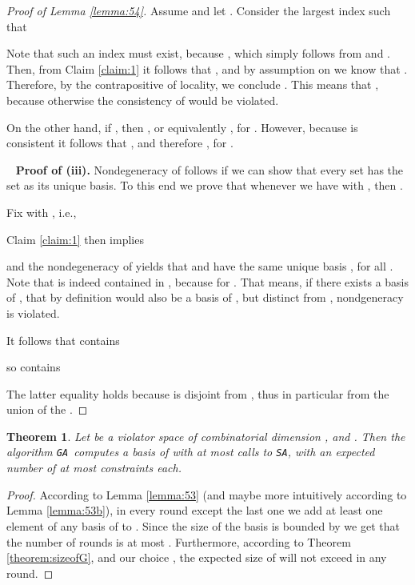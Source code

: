 \documentclass[12pt]{article}
\newtheorem{theorem2}{Theorem}[section]
\newenvironment{theorem}{\begin{theorem2}}{\end{theorem2}}
\theoremstyle{remark}
\def\stageI{\texttt{GA}}
\def\stageII{\texttt{SA}}
\begin{document}
\begin{proof}[Proof of Lemma \ref{lemma:54}]
     Assume  and let . Consider the largest index
      such that
     
     Note that such an index  must exist, because , which
     simply follows from  and .
     Then, from Claim \ref{claim:1} it follows that , and
     by assumption on  we know that . Therefore, by the contrapositive of locality,
     we conclude .
     This means that , because otherwise the 
consistency of 
     would be violated.
     
     On the other hand, if , then , or equivalently
     , for .
    However, because  is consistent it follows that , and
    therefore ,  for .
    
    ~\newline
     \textbf{Proof of (iii).}
     Nondegeneracy of  follows if we can show that every set 
     has the set  as its unique basis. To this end we prove that whenever we have
      with , then .
     
     Fix  with , i.e.,
     
     Claim \ref{claim:1} then implies
     
     and the nondegeneracy of  yields that  and
      have the same unique basis , for all .
     Note that  is indeed contained in , because 
      for . That means, if there exists a basis of ,
     that by definition would also be a basis
     of , but distinct from , nondgeneracy is violated.
     
     It follows that  contains
     
     so  contains
     
     The latter equality holds because  is disjoint from ,
     thus in particular from the union of the .
     \end{proof}
    
    \begin{theorem}
    \label{theorem:runningtime1}
    Let   be a violator space of combinatorial dimension , and  .
Then the algorithm \stageI~computes a basis of  with
 at most  calls to \stageII, with an expected number of 
at most 
constraints each.
    \end{theorem}
    \begin{proof}
    According to Lemma \ref{lemma:53} (and maybe more intuitively according to Lemma \ref{lemma:53b}),
    in every round except the last one we add at least one element of any basis of  to .
    Since the size of the basis is bounded by  we get that the number of rounds is at most . Furthermore,
    according to Theorem \ref{theorem:sizeofG}, and our choice , the expected size of  will not
    exceed  in any round.
    \end{proof}
\end{document}
